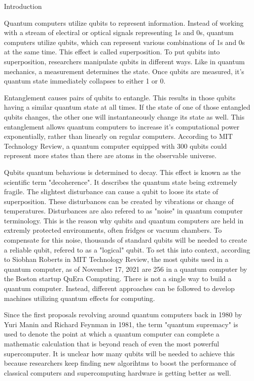 \documentclass[aps,twocolumn,preprintnumbers]{revtex4}
\begin{document}
\begin{section}{Introduction}
    

Quantum computers utilize qubits to represent information. 
Instead of working with a stream of electiral or optical signals representing 1s and 0s, 
quantum computers utilize qubits, which can represent various combinations of 1s and 0s at the same time. 
This effect is called superposition. To put qubits into superposition, 
researchers manipulate qubits in different ways. Like in quantum mechanics, 
a measurement determines the state. Once qubits are measured, 
it's quantum state immediately collapses to either 1 or 0.

Entanglement causes pairs of qubits to entangle.
This results in those qubits having a similar quantum state at all times.
If the state of one of those entangled qubits changes,
the other one will instantaneously change its state as well.
This entanglement allows quantum computers to increase it's computational power exponentially,
rather than linearly on regular computers.
According to MIT Technology Review, a quantum computer equipped with 300 qubits could represent more states than there are atoms in the observable universe.

Qubits quantum behavious is determined to decay.
This effect is known as the scientific term "decoherence".
It describes the quantum state being extremely fragile.
The slightest disturbance can cause a qubit to loose its state of superposition.
These disturbances can be created by vibrations or change of temperatures.
Disturbances are also refered to as "noise" in quantum computer terminology.
This is the reason why qubits and quantum computers are held in extremly protected environments, 
often fridges or vacuum chambers.
To compensate for this noise, 
thousands of standard qubits will be needed to create a reliable qubit, 
refered to as a "logical" qubit. 
To set this into context, 
according to Siobhan Roberts in MIT Technology Review, 
the most qubits used in a quantum computer, 
as of November 17, 2021 are 256 in a quantum computer by the Boston startup QuEra Computing. 
There is not a single way to build a quantum computer. 
Instead, different approaches can be followed to develop machines utilizing quantum effects for computing.

Since the first proposals revolving around quantum computers back in 1980 by Yuri Manin and Richard Feynman in 1981,
the term "quantum supremacy" is used to denote the point at which a quantum computer can complete a mathematic calculation that is beyond reach of even the most powerful supercomputer.
It is unclear how many qubits will be needed to achieve this because researchers keep finding new algorihtms to boost the performance of classical computers and supercomputing hardware is getting better as well.

\end{section}
\end{document}
